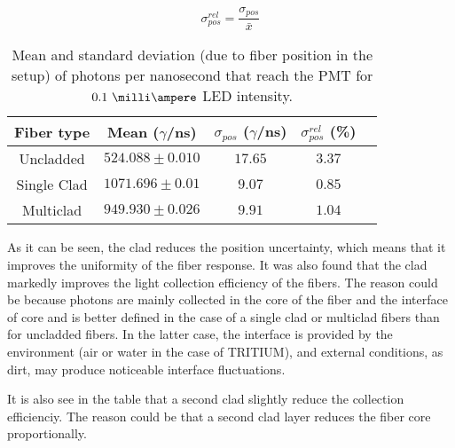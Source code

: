 \begin{equation}
\sigma^{rel}_{pos} = \frac{\sigma_{pos}}{\bar{x}}
\label{eq:RelativeStandardDesviation}
\end{equation}

\begin{table}[htbp]
\begin{center}
\begin{tabular}{|c|c|c|c|c|}
\hline
Fiber type & Mean ($\gamma$/ns) & $\sigma_{pos}$ ($\gamma$/ns) & $\sigma^{rel}_{pos}$ (\%)\\
\hline \hline \hline
Uncladded & $524.088 \pm 0.010$ & $17.65$ & $3.37$ \\ \hline
Single Clad & $1071.696 \pm 0.01$ & $9.07$ & $0.85$ \\ \hline
Multiclad & $949.930 \pm 0.026$ & $9.91$ & $1.04$ \\ \hline
\end{tabular}
\caption{Mean and standard deviation (due to fiber position in the setup) of photons per nanosecond that reach the PMT for $0.1~\milli\ampere$ LED intensity.}
\label{tab:PositionStandardDeviation}
\end{center}
\end{table}

As it can be seen, the clad reduces the position uncertainty, which means that it improves the uniformity of the fiber response. It was also found that the clad markedly improves the light collection efficiency of the fibers. The reason could be because photons are mainly collected in the core of the fiber and the interface of core and is better defined in the case of a single clad or multiclad fibers than for uncladded fibers. In the latter case, the interface is provided by the environment (air or water in the case of TRITIUM), and external conditions, as dirt, may produce noticeable interface fluctuations.

It is also see in the table that a second clad slightly reduce the collection efficienciy. The reason could be that a second clad layer reduces the fiber core proportionally.



